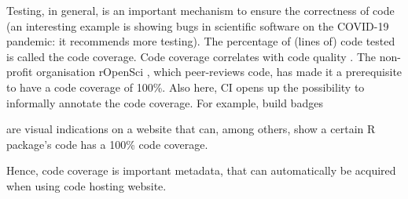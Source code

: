 Testing, in general, is an important mechanism to ensure
the correctness of code (an interesting example is \cite{rahman2020exploratory}
showing bugs in scientific software on the COVID-19 pandemic:
it recommends more testing).
The percentage of (lines of) code tested is called the code coverage.
Code coverage correlates with code quality \cite{horgan1994,del1995correlation}. 
The non-profit organisation rOpenSci \cite{ram2018community},
which peer-reviews code,
has made it a prerequisite to have a code coverage of 100\%.
Also here, CI opens up the possibility to informally annotate the
code coverage. 
For example, build badges

are visual indications on a website that can, among others,
show a certain R package's code has a 100\% code coverage.

Hence, code coverage is important metadata, that can automatically
be acquired when using code hosting website.

